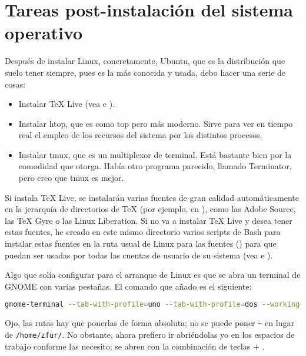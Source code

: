 \section{Tareas post-instalación del sistema operativo}\label{sec:ubuntu-post-install}
Después de instalar Linux, concretamente, Ubuntu, que es la distribución que suelo tener siempre, pues es la más
conocida y usada, debo hacer una serie de cosas:

\begin{itemize}
  \item Instalar \TeX{} Live (vea  e ).
  \item Instalar htop, que es como top pero más moderno. Sirve para ver en tiempo real el empleo de los recursos
    del sistema por los distintos procesos.
  \item Instalar tmux, que es un multiplexor de terminal. Está bastante bien por la comodidad que otorga. Había
    otro programa parecido, llamado Terminator, pero creo que tmux es mejor.
\end{itemize}

Si instala \TeX{} Live, se instalarán varias fuentes de gran calidad automáticamente en la jerarquía de
directorios de \TeX{} (por ejemplo, en ), como las
Adobe Source, las \TeX{} Gyre o las Linux Liberation. Si no va a instalar \TeX{} Live y desea tener estas
fuentes, he creado en este mismo directorio varios scripts de Bash para instalar estas fuentes en la ruta usual
de Linux para las fuentes () para que puedan ser usadas por todas las cuentas de
usuario de su sistema (vea  e ).

Algo que solía configurar para el arranque de Linux es que se abra un terminal de GNOME con varias pestañas. El
comando que añado es el siguiente:

\begin{lstlisting}[gobble=2,language=bash,style=bashinteract]
  gnome-terminal --tab-with-profile=uno --tab-with-profile=dos --working-directory=/home/ctafur/Dropbox/Documentos/otros --tab-with-profile=tres --working-directory=/home/ctafur/Dropbox/Documentos/importante --tab-with-profile=cuatro
\end{lstlisting}

\noindent Ojo, las rutas hay que ponerlas de forma absoluta; no se puede poner \lstinline+~+ en lugar de
\lstinline+/home/zfur/+. No obstante, ahora prefiero ir abriéndolas yo en los espacios de trabajo conforme las
necesito; se abren con la combinación de teclas   + .
